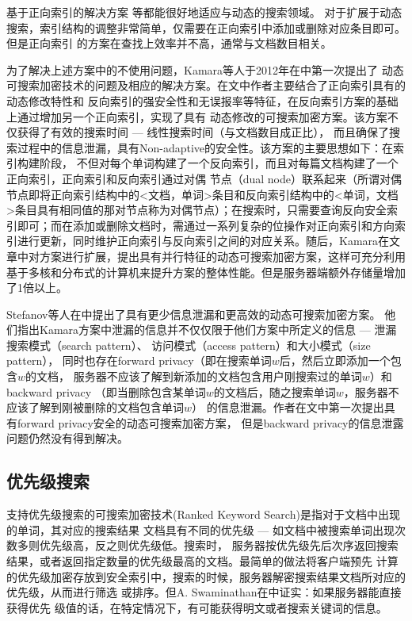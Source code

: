 基于正向索引的解决方案\cite{goh2003secure} \cite{chang2005privacy}等都能很好地适应与动态的搜索领域。
对于扩展于动态搜索，索引结构的调整非常简单，仅需要在正向索引中添加或删除对应条目即可。但是正向索引
的方案在查找上效率并不高，通常与文档数目相关。

为了解决上述方案中的不使用问题，Kamara等人于2012年在\cite{kamara2012dynamic}中第一次提出了
动态可搜索加密技术的问题及相应的解决方案。在文中作者主要结合了正向索引具有的动态修改特性和
反向索引的强安全性和无误报率等特征，在反向索引方案的基础上通过增加另一个正向索引，实现了具有
动态修改的可搜索加密方案。该方案不仅获得了有效的搜索时间 --- 线性搜索时间（与文档数目成正比），
而且确保了搜索过程中的信息泄漏，具有Non-adaptive的安全性。该方案的主要思想如下：在索引构建阶段，
不但对每个单词构建了一个反向索引，而且对每篇文档构建了一个正向索引，正向索引和反向索引通过对偶
节点（dual node）联系起来（所谓对偶节点即将正向索引结构中的<文档，单词>条目和反向索引结构中的<单词，文档>条目具有相同值的那对节点称为对偶节点）；在搜索时，只需要查询反向安全索引即可；而在添加或删除文档时，需通过一系列复杂的位操作对正向索引和方向索引进行更新，同时维护正向索引与反向索引之间的对应关系。随后，Kamara在文章\cite{kamara2013parallel}中对\cite{kamara2012dynamic}方案进行扩展，提出具有并行特征的动态可搜索加密方案，这样可充分利用基于多核和分布式的计算机来提升方案的整体性能。但是服务器端额外存储量增加了1倍以上。

Stefanov等人在\cite{stefanov2013practical}中提出了具有更少信息泄漏和更高效的动态可搜索加密方案。
他们指出Kamara方案中泄漏的信息并不仅仅限于他们方案中所定义的信息 ---
泄漏搜索模式（search pattern）\cite{liu2014search}、
访问模式（access pattern）\cite{islam2012access}和大小模式（size pattern），
同时也存在forward privacy（即在搜索单词$w$后，然后立即添加一个包含$w$的文档，
服务器不应该了解到新添加的文档包含用户刚搜索过的单词$w$）和backward privacy
（即当删除包含某单词$w$的文档后，随之搜索单词$w$，服务器不应该了解到刚被删除的文档包含单词$w$）
的信息泄漏。作者在文中第一次提出具有forward privacy安全的动态可搜索加密方案，
但是backward privacy的信息泄露问题仍然没有得到解决。


\subsection{优先级搜索}
\label{sec:search__symm_symm_ranked}
支持优先级搜索的可搜索加密技术(Ranked Keyword Search)是指对于文档中出现的单词，其对应的搜索结果
文档具有不同的优先级 --- 如文档中被搜索单词出现次数多则优先级高，反之则优先级低。搜索时，
服务器按优先级先后次序返回搜索结果，或者返回指定数量的优先级最高的文档。最简单的做法将客户端预先
计算的优先级加密存放到安全索引中，搜索的时候，服务器解密搜索结果文档所对应的优先级，从而进行筛选
或排序。但A. Swaminathan在\cite{swaminathan2007confidentiality}中证实：如果服务器能直接获得优先
级值的话，在特定情况下，有可能获得明文或者搜索关键词的信息。

